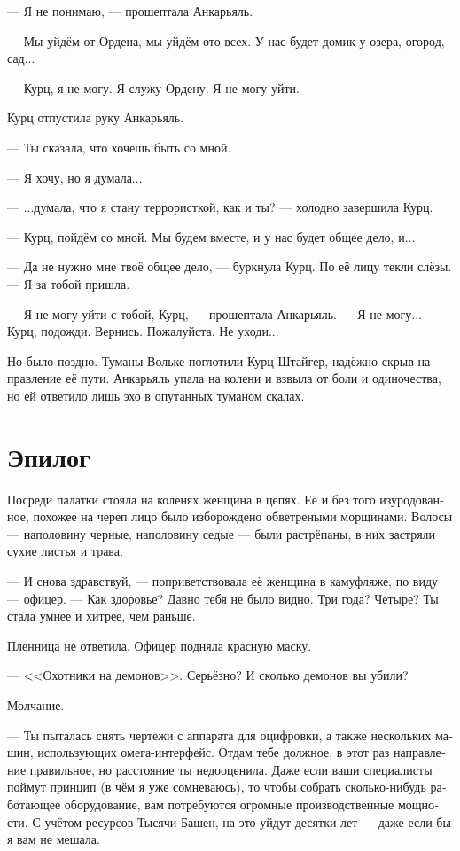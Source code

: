 \documentclass[a4paper,10pt,fleqn]{book}\usepackage{polyglossia}\setdefaultlanguage[babelshorthands=true]{russian}\setotherlanguage{english}\defaultfontfeatures{Ligatures=TeX,Mapping=tex-text}\usepackage{xcolor}\newcommand{\ml}[3]{#2}
\begin{document}
--- Я не понимаю, --- прошептала Анкарьяль.

--- Мы уйдём от Ордена, мы уйдём ото всех.
У нас будет домик у озера, огород, сад...

--- Курц, я не могу.
Я служу Ордену.
Я не могу уйти.

Курц отпустила руку Анкарьяль.

--- Ты сказала, что хочешь быть со мной.

--- Я хочу, но я думала...

--- ...думала, что я стану террористкой, как и ты? --- холодно завершила Курц.

--- Курц, пойдём со мной.
Мы будем вместе, и у нас будет общее дело, и...

--- Да не нужно мне твоё общее дело, --- буркнула Курц.
По её лицу текли слёзы.
--- Я за тобой пришла.

--- Я не могу уйти с тобой, Курц, --- прошептала Анкарьяль.
--- Я не могу...
Курц, подожди.
Вернись.
Пожалуйста.
Не уходи...

Но было поздно.
Туманы Вольке поглотили Курц Штайгер, надёжно скрыв направление её пути.
Анкарьяль упала на колени и взвыла от боли и одиночества, но ей ответило лишь эхо в опутанных туманом скалах.

\section{Эпилог}

Посреди палатки стояла на коленях женщина в цепях.
Её и без того изуродованное, похожее на череп лицо было изборождено обветреными морщинами.
Волосы --- наполовину черные, наполовину седые --- были растрёпаны, в них застряли сухие листья и трава.

--- И снова здравствуй, --- поприветствовала её женщина в камуфляже, по виду --- офицер.
--- Как здоровье?
Давно тебя не было видно.
Три года?
Четыре?
Ты стала умнее и хитрее, чем раньше.

Пленница не ответила.
Офицер подняла красную маску.

--- <<Охотники на демонов>>.
Серьёзно?
И сколько демонов вы убили?

Молчание.

--- Ты пыталась снять чертежи с аппарата для оцифровки, а также нескольких машин, использующих омега-интерфейс.
Отдам тебе должное, в этот раз направление правильное, но расстояние ты недооценила.
Даже если ваши специалисты поймут принцип (в чём я уже сомневаюсь), то чтобы собрать сколько-нибудь работающее оборудование, вам потребуются огромные производственные мощности.
С учётом ресурсов Тысячи Башен, на это уйдут десятки лет --- даже если бы я вам не мешала.
\end{document}
